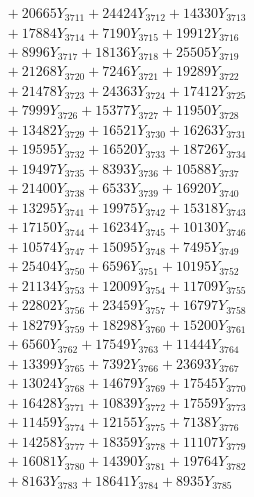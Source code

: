 \documentclass[a4paper,10pt]{article}
\begin{document}
{\begin{align}
&\;  + 20665 Y_{3711} + 24424 Y_{3712} + 14330 Y_{3713} \\[0.3ex]
&\;  + 17884 Y_{3714} + 7190 Y_{3715} + 19912 Y_{3716} \\[0.3ex]
&\;  + 8996 Y_{3717} + 18136 Y_{3718} + 25505 Y_{3719} \\[0.5ex]\allowbreak
&\;  + 21268 Y_{3720} + 7246 Y_{3721} + 19289 Y_{3722} \\[0.3ex]
&\;  + 21478 Y_{3723} + 24363 Y_{3724} + 17412 Y_{3725} \\[0.3ex]
&\;  + 7999 Y_{3726} + 15377 Y_{3727} + 11950 Y_{3728} \\[0.3ex]
&\;  + 13482 Y_{3729} + 16521 Y_{3730} + 16263 Y_{3731} \\[0.3ex]
&\;  + 19595 Y_{3732} + 16520 Y_{3733} + 18726 Y_{3734} \\[0.3ex]
&\;  + 19497 Y_{3735} + 8393 Y_{3736} + 10588 Y_{3737} \\[0.3ex]
&\;  + 21400 Y_{3738} + 6533 Y_{3739} + 16920 Y_{3740} \\[0.3ex]
&\;  + 13295 Y_{3741} + 19975 Y_{3742} + 15318 Y_{3743} \\[0.3ex]
&\;  + 17150 Y_{3744} + 16234 Y_{3745} + 10130 Y_{3746} \\[0.3ex]
&\;  + 10574 Y_{3747} + 15095 Y_{3748} + 7495 Y_{3749} \\[0.5ex]\allowbreak
&\;  + 25404 Y_{3750} + 6596 Y_{3751} + 10195 Y_{3752} \\[0.3ex]
&\;  + 21134 Y_{3753} + 12009 Y_{3754} + 11709 Y_{3755} \\[0.3ex]
&\;  + 22802 Y_{3756} + 23459 Y_{3757} + 16797 Y_{3758} \\[0.3ex]
&\;  + 18279 Y_{3759} + 18298 Y_{3760} + 15200 Y_{3761} \\[0.3ex]
&\;  + 6560 Y_{3762} + 17549 Y_{3763} + 11444 Y_{3764} \\[0.3ex]
&\;  + 13399 Y_{3765} + 7392 Y_{3766} + 23693 Y_{3767} \\[0.3ex]
&\;  + 13024 Y_{3768} + 14679 Y_{3769} + 17545 Y_{3770} \\[0.3ex]
&\;  + 16428 Y_{3771} + 10839 Y_{3772} + 17559 Y_{3773} \\[0.3ex]
&\;  + 11459 Y_{3774} + 12155 Y_{3775} + 7138 Y_{3776} \\[0.3ex]
&\;  + 14258 Y_{3777} + 18359 Y_{3778} + 11107 Y_{3779} \\[0.5ex]\allowbreak
&\;  + 16081 Y_{3780} + 14390 Y_{3781} + 19764 Y_{3782} \\[0.3ex]
&\;  + 8163 Y_{3783} + 18641 Y_{3784} + 8935 Y_{3785} \\[0.3ex]

\end{align}}
\end{document}
